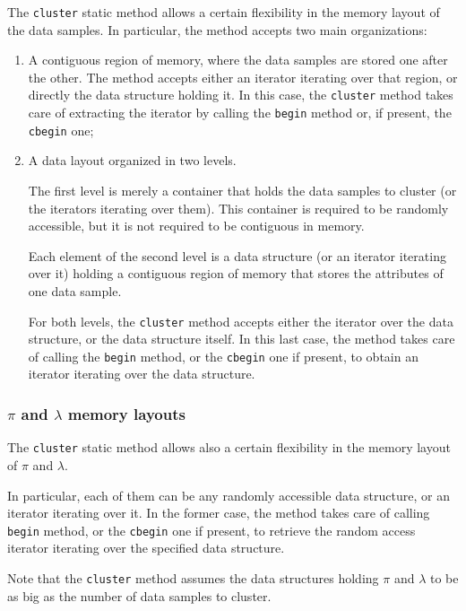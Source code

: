 \documentclass{article}
\begin{document}
The \texttt{cluster} static method allows a certain flexibility in the memory layout of the data
samples. In particular, the method accepts two main organizations:
\begin{enumerate}
\item A contiguous region of memory, where the data samples are stored one after the other.
The method accepts either an iterator iterating over that region, or directly the data
structure holding it. In this case, the \texttt{cluster} method takes care of extracting the
iterator by calling the \texttt{begin} method or, if present, the \texttt{cbegin} one;

\item A data layout organized in two levels.

The first level is merely a container that holds the data samples to cluster (or the iterators
iterating over them). This container is required to be randomly accessible, but it is not
required to be contiguous in memory.

Each element of the second level is a data structure (or an iterator iterating over it) holding a
contiguous region of memory that stores the attributes of one data sample.

For both levels, the \texttt{cluster} method accepts either the iterator over the data structure, or
the data structure itself. In this last case, the method takes care of calling the
\texttt{begin} method, or the \texttt{cbegin} one if present, to obtain an iterator iterating
over the data structure.

\end{enumerate}

\hypertarget{par-pi-lambda-layout}{
\subsubsection{\texorpdfstring{\boldmath$\pi$ and \boldmath$\lambda$}{pi and lambda} memory layouts}
\label{par-pi-lambda-layout}}

The \texttt{cluster} static method allows also a certain flexibility in the memory layout of
$\pi$ and $\lambda$.

In particular, each of them can be any randomly accessible data structure, or an iterator
iterating over it.
In the former case, the method takes care of calling \texttt{begin} method, or the
\texttt{cbegin} one if present, to retrieve the random access iterator iterating over the
specified data structure.

Note that the \texttt{cluster} method assumes the data structures holding $\pi$ and
$\lambda$ to be as big as the number of data samples to cluster.
\end{document}
